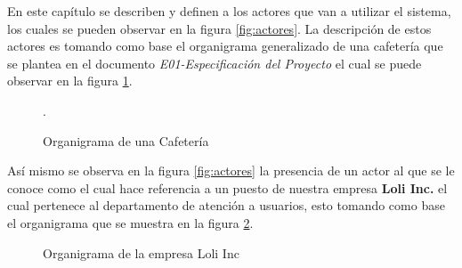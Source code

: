 
En este capítulo se describen y definen a los actores que van a utilizar el sistema, los cuales se pueden observar en la figura \ref{fig:actores}. La descripción de estos actores es tomando como base el organigrama generalizado de una cafetería que se plantea en el documento \textit{E01-Especificación del Proyecto} el cual se puede observar en la figura \ref{fig:organigramaCafeteria}.

\begin{figure}[hbtp!]
	\begin{center}
		\caption{Organigrama de una Cafetería}
		\label{fig:organigramaCafeteria}.
	\end{center}
\end{figure}

Así mismo se observa en la figura \ref{fig:actores} la presencia de un actor al que se le conoce como  el cual hace referencia a un puesto de nuestra empresa \textbf{Loli Inc.} el cual pertenece al departamento de atención a usuarios, esto tomando como base el organigrama que se muestra en la figura \ref{fig:organigramaLoliInc}.

\begin{figure}[hbtp!]
	\begin{center}
		\caption{Organigrama de la empresa Loli Inc}
		\label{fig:organigramaLoliInc}
	\end{center}
\end{figure}


